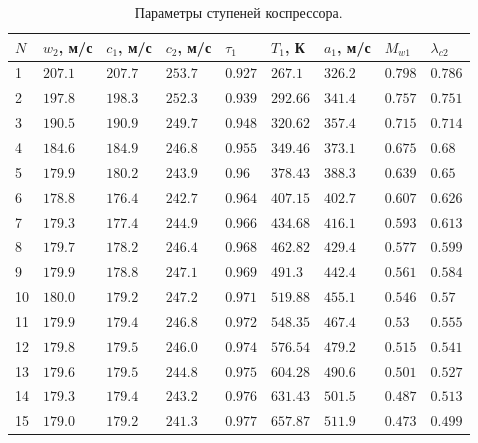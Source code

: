 \documentclass[a4paper,12pt]{article}
\begin{document}
    \begin{longtable}{|p{0.6cm}|p{1.1cm}|p{1.1cm}|p{1.1cm}|p{1.1cm}|p{1.1cm}| p{1.1cm}|p{1.1cm}|p{1.1cm}|}
        \caption{Параметры ступеней коспрессора.}\\ \hline
        $N$ & $w_2$, м/с & $c_1$, м/с & $c_2$, м/с & $\tau_1$ & $T_1$, К & $a_1$, м/с & $M_{w1}$ & $\lambda_{c2}$ \\ \hline
%        
        1 & $207.1$ &
        $207.7$ & $253.7$ & $0.927$ &
        $267.1$ & $326.2$ & $0.798$ &
        $0.786$\\ \hline
%        
        2 & $197.8$ &
        $198.3$ & $252.3$ & $0.939$ &
        $292.66$ & $341.4$ & $0.757$ &
        $0.751$\\ \hline
%        
        3 & $190.5$ &
        $190.9$ & $249.7$ & $0.948$ &
        $320.62$ & $357.4$ & $0.715$ &
        $0.714$\\ \hline
%        
        4 & $184.6$ &
        $184.9$ & $246.8$ & $0.955$ &
        $349.46$ & $373.1$ & $0.675$ &
        $0.68$\\ \hline
%        
        5 & $179.9$ &
        $180.2$ & $243.9$ & $0.96$ &
        $378.43$ & $388.3$ & $0.639$ &
        $0.65$\\ \hline
%        
        6 & $178.8$ &
        $176.4$ & $242.7$ & $0.964$ &
        $407.15$ & $402.7$ & $0.607$ &
        $0.626$\\ \hline
%        
        7 & $179.3$ &
        $177.4$ & $244.9$ & $0.966$ &
        $434.68$ & $416.1$ & $0.593$ &
        $0.613$\\ \hline
%        
        8 & $179.7$ &
        $178.2$ & $246.4$ & $0.968$ &
        $462.82$ & $429.4$ & $0.577$ &
        $0.599$\\ \hline
%        
        9 & $179.9$ &
        $178.8$ & $247.1$ & $0.969$ &
        $491.3$ & $442.4$ & $0.561$ &
        $0.584$\\ \hline
%        
        10 & $180.0$ &
        $179.2$ & $247.2$ & $0.971$ &
        $519.88$ & $455.1$ & $0.546$ &
        $0.57$\\ \hline
%        
        11 & $179.9$ &
        $179.4$ & $246.8$ & $0.972$ &
        $548.35$ & $467.4$ & $0.53$ &
        $0.555$\\ \hline
%        
        12 & $179.8$ &
        $179.5$ & $246.0$ & $0.974$ &
        $576.54$ & $479.2$ & $0.515$ &
        $0.541$\\ \hline
%        
        13 & $179.6$ &
        $179.5$ & $244.8$ & $0.975$ &
        $604.28$ & $490.6$ & $0.501$ &
        $0.527$\\ \hline
%        
        14 & $179.3$ &
        $179.4$ & $243.2$ & $0.976$ &
        $631.43$ & $501.5$ & $0.487$ &
        $0.513$\\ \hline
%        
        15 & $179.0$ &
        $179.2$ & $241.3$ & $0.977$ &
        $657.87$ & $511.9$ & $0.473$ &
        $0.499$\\ \hline
%        
    \end{longtable}
\end{document}

